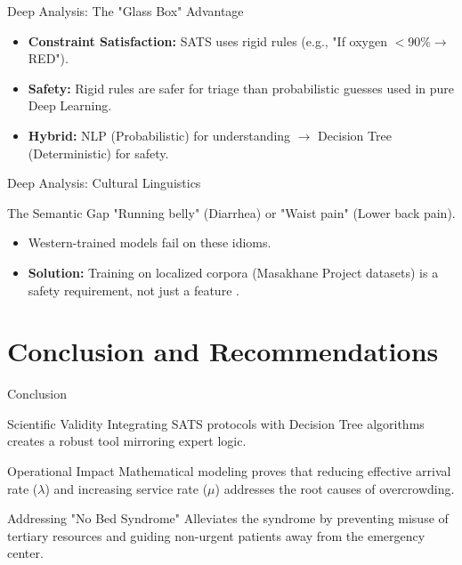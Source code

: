 \documentclass[aspectratio=169,12pt]{beamer}
\begin{document}
	\begin{frame}{Deep Analysis: The "Glass Box" Advantage}
		\begin{itemize}
			\item \textbf{Constraint Satisfaction:} SATS uses rigid rules (e.g., "If oxygen $<90\% \to$ RED").
			\item \textbf{Safety:} Rigid rules are safer for triage than probabilistic guesses used in pure Deep Learning.
			\item \textbf{Hybrid:} NLP (Probabilistic) for understanding $\to$ Decision Tree (Deterministic) for safety.
		\end{itemize}
	\end{frame}
	
	\begin{frame}{Deep Analysis: Cultural Linguistics}
		\begin{block}{The Semantic Gap}
			"Running belly" (Diarrhea) or "Waist pain" (Lower back pain).
		\end{block}
		
		\begin{itemize}
			\item Western-trained models fail on these idioms.
			\item \textbf{Solution:} Training on localized corpora (Masakhane Project datasets) is a safety requirement, not just a feature \citep{Adelani2025}.
		\end{itemize}
	\end{frame}
	
	\section{Conclusion and Recommendations}
	
	\begin{frame}{Conclusion}
		\begin{block}{Scientific Validity}
			Integrating SATS protocols with Decision Tree algorithms creates a robust tool mirroring expert logic.
		\end{block}
		
		\begin{block}{Operational Impact}
			Mathematical modeling proves that reducing effective arrival rate ($\lambda$) and increasing service rate ($\mu$) addresses the root causes of overcrowding.
		\end{block}
		
		\begin{block}{Addressing "No Bed Syndrome"}
			Alleviates the syndrome by preventing misuse of tertiary resources and guiding non-urgent patients away from the emergency center.
		\end{block}
	\end{frame}
	
\end{document}
